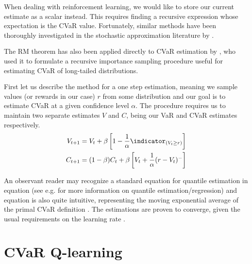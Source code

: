 When dealing with reinforcement learning, we would like to store our current estimate as a scalar instead. This requires finding a recursive expression whose expectation is the CVaR value. Fortunately, similar methods have been thoroughly investigated in the stochastic approximation literature by \citet{robbins1951stochastic}.

The RM theorem has also been applied directly to CVaR estimation by \citet{bardou2009recursive}, who used it to formulate a recursive importance sampling procedure useful for estimating CVaR of long-tailed distributions.

First let us describe the method for a one step estimation, meaning we sample values (or rewards in our case) $r$ from some distribution and our goal is to estimate CVaR at a given confidence level $\alpha$. The procedure requires us to maintain two separate estimates $V$ and $C$, being our VaR and CVaR estimates respectively.
\begin{align}
V_{t+1} &= V_{t} + \beta \bsquare{1-\dfrac{1}{\alpha}\indicator_{(V_t \ge r)}}\label{eqn:varestimate}\\
C_{t+1} &= (1-\beta)C_t + \beta \bsquare{V_t + \dfrac{1}{\alpha}(r-V_t)^-}\label{eqn:cvarestimate}
\end{align}

An observant reader may recognize a standard equation for quantile estimation in equation  (see e.g. \citet{koenker2001quantile} for more information on quantile estimation/regression) and equation  is also quite intuitive, representing the moving exponential average of the primal CVaR definition . The estimations are proven to converge, given the usual requirements on the learning rate  \citep{bardou2009recursive}.


\section{CVaR Q-learning}\label{sec:qcvar}


